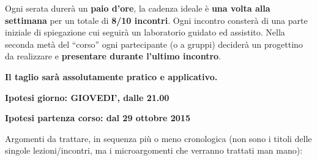 \documentclass[a4paper,12pt]{article}
\begin{document}
Ogni serata durerà un \textbf{paio d'ore}, la cadenza ideale è \textbf{una volta 
alla settimana} per un totale di \textbf{8/10 incontri}. Ogni incontro consterà 
di una parte iniziale di spiegazione cui seguirà un laboratorio guidato ed 
assistito. Nella seconda metà del ``corso'' ogni partecipante (o a gruppi) 
deciderà un progettino da realizzare e \textbf{presentare durante l'ultimo 
incontro}.

\textbf{Il taglio sarà assolutamente pratico e applicativo.}


\hrulefill

\textbf{Ipotesi giorno: GIOVEDI', dalle 21.00}


\hrulefill

\textbf{Ipotesi partenza corso: dal 29 ottobre 2015}


\hrulefill


Argomenti da trattare, in sequenza più o meno cronologica (non sono i titoli 
delle singole lezioni/incontri, ma i microargomenti che verranno trattati man 
mano):
\end{document}

